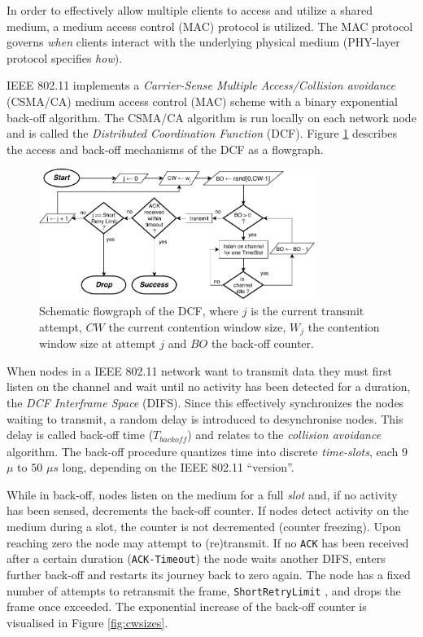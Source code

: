 In order to effectively allow multiple clients to access and utilize a shared
medium, a medium access control (MAC) protocol is utilized. The MAC
protocol governs \emph{when} clients interact with the underlying physical
medium (PHY-layer protocol specifies \emph{how}).

IEEE 802.11 implements a \emph{Carrier-Sense Multiple Access/Collision
avoidance} (CSMA/CA) medium access control (MAC) scheme with a binary
exponential back-off algorithm. The CSMA/CA algorithm is run locally on each
network node and is called the \emph{Distributed Coordination Function} (DCF).
Figure \ref{fig:dcfgraph} describes the access and back-off mechanisms of the
DCF as a flowgraph.

\begin{figure}
\center
\includegraphics[width=0.8\textwidth]{images/ieee-80211-dcf.pdf}
\caption{Schematic flowgraph of the DCF, where $j$ is the current transmit attempt, $CW$ the current contention window size, $W_j$ the contention window size at attempt $j$ and $BO$ the back-off counter.}
\label{fig:dcfgraph}
\end{figure}


When nodes in a IEEE 802.11 network want to transmit data they must first
listen on the channel and wait until no activity has been detected for a
duration, the \emph{DCF Interframe Space} (DIFS). Since this effectively
synchronizes the nodes waiting to transmit, a random delay is introduced to
desynchronise nodes. This delay is called back-off time
($T_{\mathit{backoff}}$) and relates to the \emph{collision avoidance}
algorithm. The back-off procedure quantizes time into discrete
\emph{time-slots}, each $9$ $\mu$ to $50$ $\mu s$ long, depending on the IEEE
802.11 ``version''.

While in back-off, nodes listen on the medium for a full \emph{slot} and, if
no activity has been sensed, decrements the back-off counter. If nodes detect
activity on the medium during a slot, the counter is not decremented (counter
freezing). Upon reaching zero the node may attempt to (re)transmit. If no
\texttt{ACK} has been received after a certain duration (\texttt{ACK-Timeout})
the node waits another DIFS, enters further back-off and restarts its journey
back to zero again. The node has a fixed number of attempts to retransmit the
frame, \texttt{ShortRetryLimit} \cite{654749}, and drops the frame once
exceeded. The exponential increase of the back-off counter is visualised in
Figure \ref{fig:cwsizes}.


